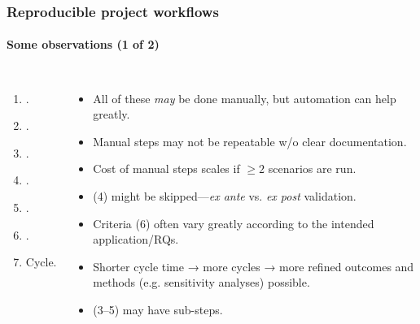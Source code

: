 \documentclass[12pt,aspectratio=169]{beamer}
\begin{document}
\begin{frame}
\frametitle{Reproducible project workflows}
\framesubtitle{Some observations (1 of 2)}

\begin{columns}[T]
\begin{enumerate}
  \item {}.
  \item {}.
  \item {}.
  \item {}.
  \item {}.
  \item {}.
  \item Cycle.
\end{enumerate}

\begin{itemize}
  \item All of these \emph{may} be done manually, but automation can help greatly.
  \item Manual steps may not be repeatable w/o clear documentation.
  \item Cost of manual steps scales if $\geq 2$ scenarios are run.
  \item (4) might be skipped—\emph{ex ante} vs. \emph{ex post} validation.
  \item Criteria (6) often vary greatly according to the intended application/RQs.
  \item Shorter cycle time → more cycles → more refined outcomes and methods (e.g. sensitivity analyses) possible.
  \item (3–5) may have sub-steps.
\end{itemize}

\end{columns}
\end{frame}
\end{document}
